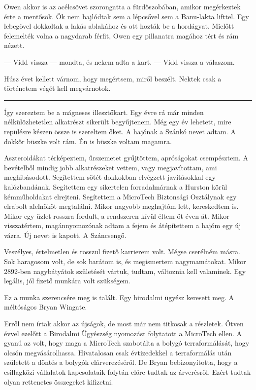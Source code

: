 \documentclass[10pt]{memoir}
\renewcommand{\pfbreakdisplay}{\bigskip \ding{70} \bigskip}
\newcommand{\secbreak}{\fancybreak{\pfbreakdisplay}}
\begin{document}
Owen akkor is az acélcsövet szorongatta a fürdőszobában, amikor megérkeztek
érte a mentősök. Ők nem bajlódtak sem a lépcsővel sem a Banu-lakta lifttel. Egy
lebegővel dokkoltak a lakás ablakához és ott hozták be a hordágyat. Mielőtt
felemelték volna a nagydarab férfit, Owen egy pillanatra magához tért és rám
nézett.

--- Vidd vissza --- mondta, és nekem adta a kart. --- Vidd vissza a válaszom.

Húsz évet kellett várnom, hogy megértsem, miről beszélt. Nektek csak a
történetem végét kell megvárnotok.

\secbreak

Így szereztem be a mágneses illesztőkart. Egy évre rá már minden
nélkülözhetetlen alkatrészt sikerült begyűjtenem. Még egy év lehetett, mire
repülésre készen össze is szereltem őket. A hajónak a Szánkó nevet adtam. A
dokkőr büszke volt rám. Én is büszke voltam magamra.

Aszteroidákat térképeztem, űrszemetet gyűjtöttem, apróságokat csempésztem. A
bevételből mindig jobb alkatrészeket vettem, vagy megjavítottam, ami
meghibásodott. Segítettem sötét dokkokban elvégzett javításokkal egy
kalózbandának. Segítettem egy sikertelen forradalmárnak a Hurston körül
kémműholdakat elrejteni. Segítettem a MicroTech Biztonsági Osztálynak egy
elrabolt alelnököt megtalálni. Mikor nagyobb meghajtóm lett, kereskedtem is.
Mikor egy üzlet rosszra fordult, a rendszeren kívül éltem öt éven át. Mikor
visszatértem, magánnyomozónak adtam a fejem és átépítettem a hajóm egy új
vázra. Új nevet is kapott. A Száncsengő.

Veszélyes, értelmetlen és rosszul fizető karrierem volt. Mégse cserélném másra.
Sok haragosom volt, de sok barátom is, és megismertem nagymamátokat. Mikor
2892-ben nagybátyátok születését vártuk, tudtam, változnia kell valaminek. Egy
legális, jól fizető munkára volt szükségem.

Ez a munka szerencsére meg is talált. Egy birodalmi ügyész keresett meg. A
méltóságos Bryan Wingate.

Erről nem írtak akkor az újságok, de most már nem titkosak a részletek. Ötven
évvel ezelőtt a Birodalmi Ügyészség nyomozást folytatott a MicroTech ellen. A
gyanú az volt, hogy maga a MicroTech szabotálta a bolygó terraformálását, hogy
olcsón megvásárolhassa. Hivatalosan csak évtizedekkel a terraformálás után
született a döntés a bolygók elárverezéséről. De Bryan bebizonyította, hogy a
csillagközi vállalatok kapcsolataik folytán előre tudtak az árverésről. Ezért
tudtak olyan rettenetes összegeket kifizetni.
\end{document}
